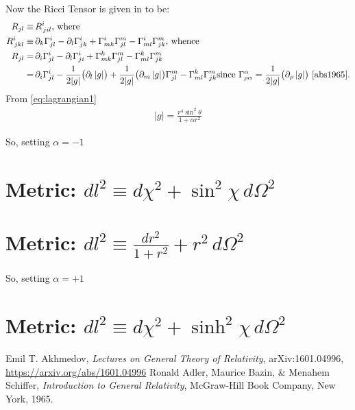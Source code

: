 \documentclass[]{article}
\begin{document}
Now the Ricci Tensor is given in \cite[II, (58) and (56)]{Akhmedov2017} to be:
\begin{align*}
R_{jl}\equiv&\, R^i_{\,jil}\text{, where}\\
R^i_{\,jkl}\equiv&\,\partial_k\Gamma^i_{jl}-\partial_l\Gamma^i_{jk}+\Gamma^i_{mk} \Gamma^m_{jl} - \Gamma^i_{ml} \Gamma^m_{jk}\text{, whence}\\
R_{jl}=&\,\partial_i\Gamma^i_{jl}-\partial_l\Gamma^i_{ji}+\Gamma^k_{mk} \Gamma^m_{jl} - \Gamma^k_{ml} \Gamma^m_{jk}\\
=&\,\partial_i\Gamma^i_{jl}-\frac{1}{2|g|}\big(\partial_l \, |g|\big)+\frac{1}{2|g|}\big(\partial_m \, |g|\big) \Gamma^m_{jl} - \Gamma^k_{ml} \Gamma^m_{jk}\text{since $\Gamma^{\alpha}_{\rho\alpha}=\frac{1}{2|g|}\big(\partial_\rho \, |g|\big)$ \cite{abs1965}.}
\end{align*}
From \eqref{eq:lagrangian1}
\begin{align*}
|g|=\frac{r^4\sin^2 \theta}{1+\alpha r^2}
\end{align*}




So, setting $\alpha=-1$
\section{Metric: $dl^2\equiv d\chi^2+\sin^2 \chi\,d\Omega^2$}
\section{Metric: $dl^2\equiv\frac{dr^2}{1+r^2}+r^2\,d\Omega^2$}  \label{section:metric3}
So, setting $\alpha=+1$
\section{Metric: $dl^2\equiv d\chi^2+\sinh^2 \chi\,d\Omega^2$}

\begin{thebibliography}{9}\label{section:biblio}
	\raggedright
	Emil T. Akhmedov,
	\emph{Lectures on General Theory of Relativity},
	arXiv:1601.04996,
	\url{https://arxiv.org/abs/1601.04996}
	Ronald Adler, Maurice Bazin, \& Menahem Schiffer,
	\emph{Introduction to General Relativity},
	McGraw-Hill Book Company, New York,
	1965.
\end{thebibliography}
\end{document}
